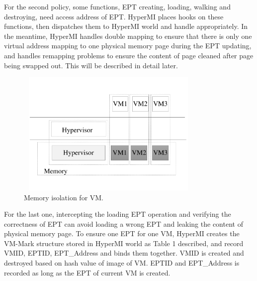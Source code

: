 \documentclass[conference]{IEEEtran}
\begin{document}
For the second policy, some functions, EPT creating, loading, walking and destroying, need access address of EPT. HyperMI places hooks on these functions, then dispatches them to HyperMI world and handle appropriately. In the meantime, HyperMI handles double mapping to ensure that there is only one virtual address mapping to one physical memory page during the EPT updating, and handles remapping problems to ensure the content of page cleaned after page being swapped out. This will be described in detail later.
\begin{figure}
\centerline{\includegraphics[width=9cm, height=6cm]{pdfvmcs3.pdf}}%
\caption{Memory isolation for VM.} \label{fig3}
\end{figure}
For the last one, intercepting the loading EPT operation and verifying the correctness of EPT can avoid loading a wrong EPT and leaking the content of physical memory page. To ensure one EPT for one VM, HyperMI creates the VM-Mark structure stored in HyperMI world as Table 1 described, and record VMID, EPTID, EPT\_Address and binds them together. VMID is created and destroyed based on hash value of image of VM. EPTID and EPT\_Address is recorded as long as the EPT of current VM is created.
\end{document}
